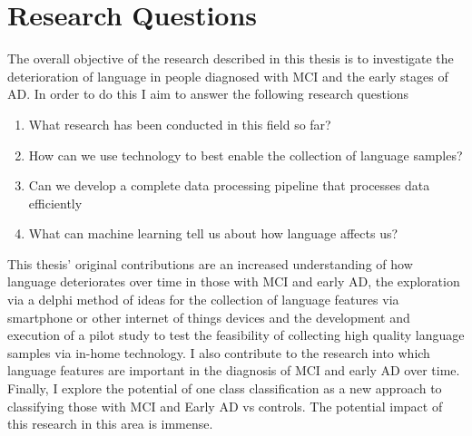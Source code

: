 \section{Research Questions}
The overall objective of the research described in this thesis is to investigate the deterioration of language in people diagnosed with MCI and the early stages of AD. In order to do this I aim to answer the following research questions
\begin{enumerate}
	\item What research has been conducted in this field so far?
	\item How can we use technology to best enable the collection of language samples?
	\item Can we develop a complete data processing pipeline that processes data efficiently
	\item What can machine learning tell us about how language affects us?
\end{enumerate} 
\par 
This thesis' original contributions are an increased understanding of how language deteriorates over time in those with MCI and early AD, the exploration via a delphi method of ideas for the collection of language features via smartphone or other internet of things devices and the development and execution of a pilot study to test the feasibility of collecting high quality language samples via in-home technology. I also contribute to the research into which language features are important in the diagnosis of MCI and early AD over time. Finally, I explore the potential of one class classification as a new approach to classifying those with MCI and Early AD vs controls. The potential impact of this research in this area is immense. 
